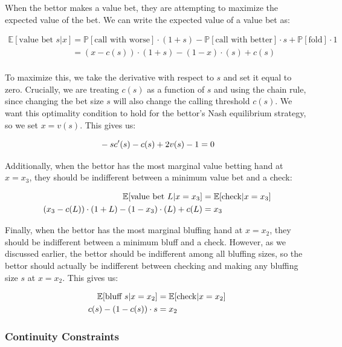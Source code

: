 \documentclass[a4paper,12pt]{article}
\theoremstyle{plain}
\theoremstyle{definition}
\begin{document}
When the bettor makes a value bet, they are attempting to maximize the expected value of the bet. We can write the expected value of a value bet as:

\begin{align*}
    \mathbb{E}[\text{value bet } s | x] & = \mathbb{P}[\text{call with worse}] \cdot (1+s) - \mathbb{P}[\text{call with better}] \cdot s + \mathbb{P}[\text{fold}] \cdot 1 \\
    & = (x-c(s)) \cdot (1+s) - (1-x) \cdot (s) + c(s)\\
\end{align*}

To maximize this, we take the derivative with respect to $s$ and set it equal to zero. Crucially, we are treating $c(s)$ as a function of $s$ and using the chain rule, since changing the bet size $s$ will also change the calling threshold $c(s)$. We want this optimality condition to hold for the bettor's Nash equilibrium strategy, so we set $x=v(s)$. This gives us:

\begin{equation}{\label{valueoptimality}}
    -sc'(s) - c(s) + 2 v(s) - 1 = 0
\end{equation}

Additionally, when the bettor has the most marginal value betting hand at $x=x_3$, they should be indifferent between a minimum value bet and a check: 

\begin{align}{\label{valueindiff}}
    \nonumber \mathbb{E}[\text{value bet } L | x=x_3] & = \mathbb{E}[\text{check} | x=x_3]\\ 
    (x_3-c(L)) \cdot (1+L) - (1-x_3) \cdot (L) + c(L) & = x_3
\end{align}

Finally, when the bettor has the most marginal bluffing hand at $x=x_2$, they should be indifferent between a minimum bluff and a check. However, as we discussed earlier, the bettor should be indifferent among all bluffing sizes, so the bettor should actually be indifferent between checking and making any bluffing size $s$ at $x=x_2$. This gives us:

\begin{align}{\label{bluffindiff}}
    \nonumber \mathbb{E}[\text{bluff } s | x=x_2] & = \mathbb{E}[\text{check} | x=x_2]\\ 
    c(s) - (1-c(s)) \cdot s & = x_2
\end{align}

\subsubsection{Continuity Constraints}
\end{document}
